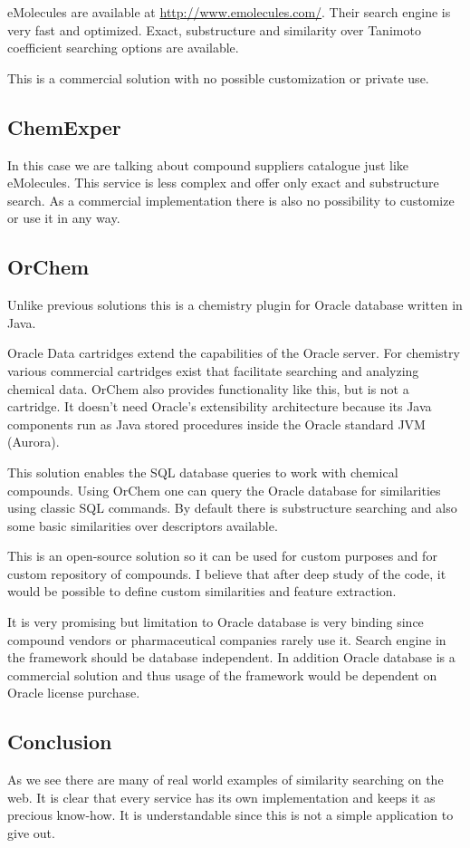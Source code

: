 \documentclass[thesis=M,english]{FITthesis}[2012/10/20]
\begin{document}
eMolecules are available at \url{http://www.emolecules.com/}. Their search engine is very fast and optimized. Exact, substructure and similarity over Tanimoto coefficient searching options are available.

This is a commercial solution with no possible customization or private use.

\subsection{ChemExper}
In this case we are talking about compound suppliers catalogue just like eMolecules. This service is less complex and offer only exact and substructure search. As a commercial implementation there is also no possibility to customize or use it in any way.

\subsection{OrChem}
Unlike previous solutions this is a chemistry plugin for Oracle database written in Java. 

Oracle Data cartridges extend the capabilities of the Oracle server. For chemistry various commercial cartridges exist that facilitate searching and analyzing chemical data. OrChem also provides functionality like this, but is not a cartridge. It doesn't need Oracle's extensibility architecture because its Java components run as Java stored procedures inside the Oracle standard JVM (Aurora).\cite{orchem}

This solution enables the SQL database queries to work with chemical compounds. Using OrChem one can query the Oracle database for similarities using classic SQL commands. By default there is substructure searching and also some basic similarities over descriptors available.

This is an open-source solution so it can be used for custom purposes and for custom repository of compounds. I believe that after deep study of the code, it would be possible to define custom similarities and feature extraction.

It is very promising but limitation to Oracle database is very binding since compound vendors or pharmaceutical companies rarely use it. Search engine in the framework should be database independent. In addition Oracle database is a commercial solution and thus usage of the framework would be dependent on Oracle license purchase.

\subsection{Conclusion}
As we see there are many of real world examples of similarity searching on the web. It is clear that every service has its own implementation and keeps it as precious know-how. It is understandable since this is not a simple application to give out.
\end{document}
